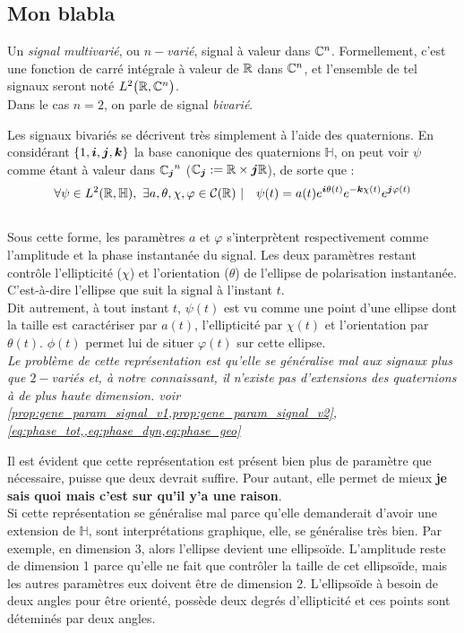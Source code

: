 \subsection{Mon blabla}\label{subsec:blabla}


\begin{definition} \label{def:signal_multivar}
Un \emph{signal multivarié}, ou \emph{$n-$varié}, signal à valeur dans $\C^n$. Formellement, c'est une fonction de carré intégrale à valeur de $\R$ dans $\C^n$, et l'ensemble de tel signaux seront noté $L^2\big(\R,\C^n\big)$.
\\
Dans le cas $n=2$, on parle de signal \emph{bivarié}.
\end{definition}

\begin{proposition}\label{prop:quatern}
Les signaux bivariés se décrivent très simplement à l'aide des quaternions. En considérant $\{1, \bf{i},\bf{j},\bf{k}\}$ la base canonique des quaternions $\mathbb{H}$, on peut voir $\psi$ comme étant à valeur dans ${\C_{\bf{j}}}^n$ ($\C_{\bf{j}} :=\R\times \bf{j}\R$), de sorte que :
\[\forall \psi\in L^2(\R,\mathbb{H}),\ \exists a,\theta,\chi,\varphi \in\mathcal{C}(\R)\ |\quad \psi(t) = a(t)e^{\bf{i}\theta(t)}e^{-\bf{k}\chi(t)}e^{\bf{j}\varphi(t)}\]
\\
Sous cette forme, les paramètres $a$ et $\varphi$ s'interprètent respectivement comme l'amplitude et la phase instantanée du signal. Les deux paramètres restant contrôle l'ellipticité ($\chi$) et l'orientation ($\theta$) de l’ellipse de polarisation instantanée. C'est-à-dire l'ellipse que suit la signal à l'instant $t$.
\\
Dit autrement, à tout instant $t$, $\psi(t)$ est vu comme une point d'une ellipse dont la taille est caractériser par $a(t)$, l'ellipticité par $\chi(t)$ et l'orientation par $\theta(t)$. $\phi(t)$ permet lui de situer $\varphi(t)$ sur cette ellipse.
\\

\textit{Le problème de cette représentation est qu'elle se généralise mal aux signaux plus que $2-$variés et, à notre connaissant, il n'existe pas d'extensions des quaternions à de plus haute dimension. voir \cref{prop:gene_param_signal_v1,prop:gene_param_signal_v2}, \cref{eq:phase_tot,,eq:phase_dyn,eq:phase_geo}} 
\end{proposition}

Il est évident que cette représentation est présent bien plus de paramètre que nécessaire, puisse que deux devrait suffire. Pour autant, elle permet de mieux \textbf{je sais quoi mais c'est sur qu'il y'a une raison}.
\\
Si cette représentation se généralise mal parce qu'elle demanderait d'avoir une extension de $\mathbb{H}$, sont interprétations graphique, elle, se généralise très bien. Par exemple, en dimension 3, alors l'ellipse devient une ellipsoïde. L'amplitude reste de dimension 1 parce qu'elle ne fait que contrôler la taille de cet ellipsoïde, mais les autres paramètres eux doivent être de dimension 2. L'ellipsoïde à besoin de deux angles pour être orienté, possède deux degrés d'ellipticité et ces points sont déteminés par deux angles.
\\

